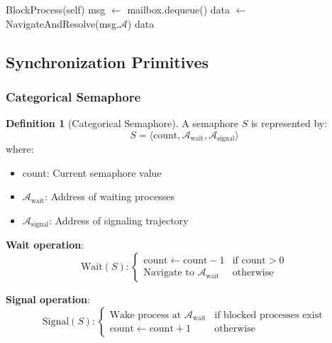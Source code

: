 \documentclass[twocolumn,10pt]{article}
\theoremstyle{definition}
\newtheorem{definition}[theorem]{Definition}
\theoremstyle{remark}
\newcommand{\cataddr}{\mathcal{A}}
\begin{document}
\begin{algorithm}
\caption{Receive Message}
\begin{algorithmic}[1]
        \State BlockProcess(self)
    \EndIf
    \State msg $\gets$ mailbox.dequeue()
    \State data $\gets$ NavigateAndResolve(msg.$\cataddr$)
    \State \Return data
\EndFunction
\end{algorithmic}
\end{algorithm}

\subsection{Synchronization Primitives}

\subsubsection{Categorical Semaphore}

\begin{definition}[Categorical Semaphore]
A semaphore $S$ is represented by:
\begin{equation}
    S = \langle \text{count}, \cataddr_{\text{wait}}, \cataddr_{\text{signal}} \rangle
\end{equation}
where:
\begin{itemize}
    \item count: Current semaphore value
    \item $\cataddr_{\text{wait}}$: Address of waiting processes
    \item $\cataddr_{\text{signal}}$: Address of signaling trajectory
\end{itemize}
\end{definition}

\textbf{Wait operation}:
\begin{equation}
    \text{Wait}(S): \begin{cases}
        \text{count} \gets \text{count} - 1 & \text{if count} > 0 \\
        \text{Navigate to } \cataddr_{\text{wait}} & \text{otherwise}
    \end{cases}
\end{equation}

\textbf{Signal operation}:
\begin{equation}
    \text{Signal}(S): \begin{cases}
        \text{Wake process at } \cataddr_{\text{wait}} & \text{if blocked processes exist} \\
        \text{count} \gets \text{count} + 1 & \text{otherwise}
    \end{cases}
\end{equation}
\end{document}
